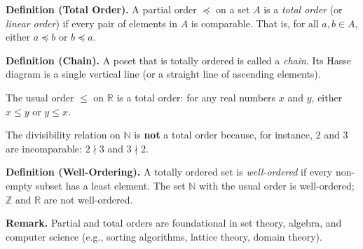 \documentclass[11pt,a4paper]{article}
\begin{document}
\textbf{Definition (Total Order).} A partial order $\preceq$ on a set $A$ is a \textit{total order} (or \textit{linear order}) if every pair of elements in $A$ is comparable. That is, for all $a, b \in A$, either $a \preceq b$ or $b \preceq a$.

\textbf{Definition (Chain).} A poset that is totally ordered is called a \textit{chain}. Its Hasse diagram is a single vertical line (or a straight line of ascending elements).

\begin{example}
The usual order $\leq$ on $\mathbb{R}$ is a total order: for any real numbers $x$ and $y$, either $x \leq y$ or $y \leq x$.
\end{example}

\begin{example}
The divisibility relation on $\mathbb{N}$ is \textbf{not} a total order because, for instance, 2 and 3 are incomparable: $2 \nmid 3$ and $3 \nmid 2$.
\end{example}

\textbf{Definition (Well-Ordering).} A totally ordered set is \textit{well-ordered} if every non-empty subset has a least element. The set $\mathbb{N}$ with the usual order is well-ordered; $\mathbb{Z}$ and $\mathbb{R}$ are not well-ordered.

\textbf{Remark.} Partial and total orders are foundational in set theory, algebra, and computer science (e.g., sorting algorithms, lattice theory, domain theory).
\end{document}
